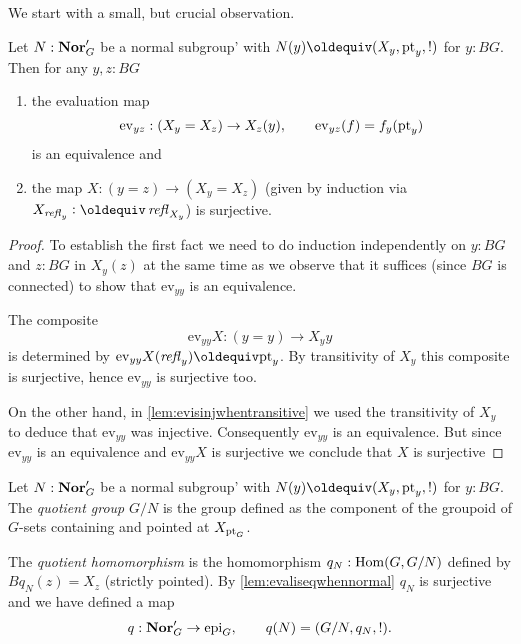 We start with a small, but crucial observation.
\begin{lemma}
  \label{lem:evaliseqwhennormal}
  Let $N:\mathbf{Nor}'_G$ be a normal subgroup' with $N(y)\oldequiv (X_y,\pt_y,!)$ for $y:BG$.  Then for any $y,z:BG$
  \begin{enumerate}
  \item the evaluation map
$$\mathrm{ev}_{yz}:(X_y=X_z)\to X_z(y),\qquad \mathrm{ev}_{yz}(f)=f_y(\mathrm{pt}_y)$$
is an equivalence and
  \item  the map $X:(y=z)\to(X_y=X_z)$ (given by induction via $X_{\refl y}\defequi\refl{X_y}$) is surjective.
  \end{enumerate}
\end{lemma}
\begin{proof}
To establish the first fact we need to do induction independently on $y:BG$ and $z:BG$ in $X_y(z)$ at the same time as we observe that it suffices (since $BG$ is connected) to show that $\mathrm{ev}_{yy}$ is an equivalence.

The composite 
$$\mathrm{ev}_{yy}X:(y=y)\to X_yy$$ is determined by $\mathrm{ev}_{yy}X(\refl y)\oldequiv \pt_y$. 
By transitivity of $X_y$ this composite is surjective, hence $\mathrm{ev}_{yy}$ is surjective too.  

On the other hand, in  \cref{lem:evisinjwhentransitive} we used the transitivity of $X_y$ to deduce that $\mathrm{ev}_{yy}$ was injective.  Consequently $\mathrm{ev}_{yy}$ is an equivalence.  But since $\mathrm{ev}_{yy}$ is an equivalence and $\mathrm{ev}_{yy}X$ is surjective we conclude that $X$ is surjective
\end{proof}
\begin{definition}
\label{def:normalquotient}
  Let $N:\mathbf{Nor}'_G$ be a normal subgroup' with $N(y)\oldequiv (X_y,\pt_y,!)$ for $y:BG$.  The \emph{quotient group} $G/N$ is the group defined as the component of the groupoid of $G$-sets containing and pointed at $X_{\mathrm{pt}_G}$.  

The \emph{quotient homomorphism} is the homomorphism $q_N:\mathrm{Hom}(G,G/N)$  defined by $Bq_N(z)=X_z$ (strictly pointed).  By \cref{lem:evaliseqwhennormal} $q_N$ is surjective and we have defined a map
$$q:\mathbf{Nor}_G'\to\mathrm{epi}_G,\qquad q(N)=(G/N,q_N,!).$$
\end{definition}

